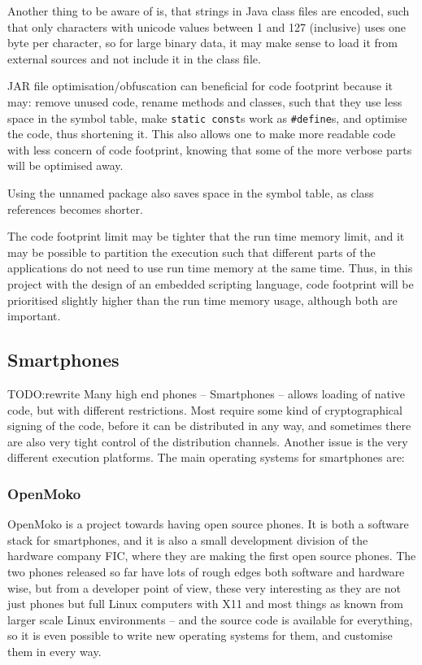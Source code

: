 \documentclass[11pt]{report}
\begin{document}
Another thing to be aware of is, that strings in Java class files are encoded, such that only characters with unicode values between 1 and 127 (inclusive) uses one byte per character, so for large binary data, it may make sense to load it from external sources and not include it in the class file.

JAR file optimisation/obfuscation can beneficial for code footprint because it may:
remove unused code,
rename methods and classes, such that they use less space in the symbol table,
make \verb|static const|s work as \verb|#define|s,
 and optimise the code, thus shortening it.
This also allows one to make more readable code with less concern of code footprint, knowing that some of the more verbose parts will be optimised away.

Using the unnamed package also saves space in the symbol table, as class references becomes shorter.

The code footprint limit may be tighter that the run time memory limit, and it may be possible to partition the execution such that different parts of the applications do not need to use run time memory at the same time.
Thus, in this project with the design of an embedded scripting language, code footprint will be prioritised slightly higher than the run time memory usage, although both are important.

\subsection{Smartphones}

TODO:rewrite
Many high end phones -- Smartphones --  allows loading of native code, but with different restrictions.
Most require some kind of cryptographical signing of the code, before it can be distributed in any way, and sometimes there are also very tight control of the distribution channels.
Another issue is the very different execution platforms.
The main operating systems for smartphones are:

\subsubsection{OpenMoko}

OpenMoko is a project towards having open source phones.
It is both a software stack for smartphones, and it is also a small development division of the hardware company FIC, where they are making the first open source phones.
The two phones released so far have lots of rough edges both software and hardware wise, but from a developer point of view, these very interesting as they are not just phones but full Linux computers with X11 and most things as known from larger scale Linux environments -- and the source code is available for everything, so it is even possible to write new operating systems for them, and customise them in every way.
\end{document}
